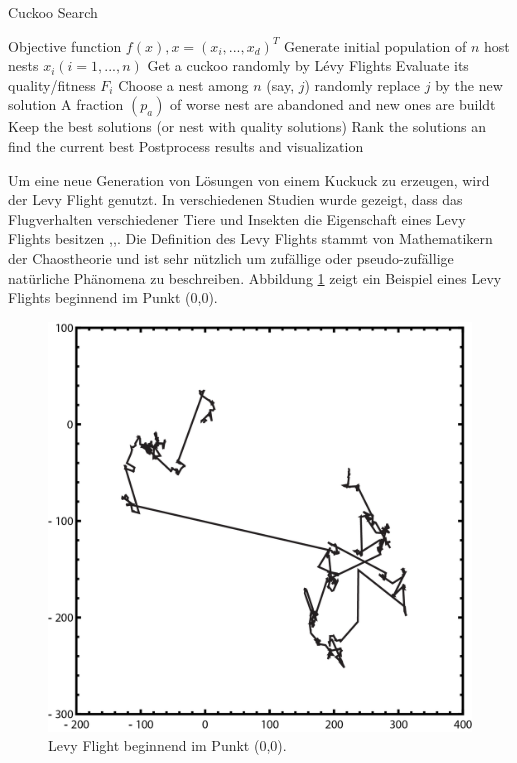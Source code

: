 \documentclass[conference]{IEEEtran}
\begin{document}
      \begin{algorithm}
      \caption{Cuckoo Search}\label{cuckooSearch}
        \begin{algorithmic}[1]
        \State Objective function $f(x), x = (x_{i}, ...,x_{d})^T$
        \State Generate initial population of $n$ host nests $x_{i} (i =1,...,n)$
          \State Get a cuckoo randomly by Lévy Flights
          \State Evaluate its quality/fitness $F_{i}$
          \State Choose a nest among $n$ (say, $j$) randomly
            \State replace $j$ by the new solution
          \EndIf
          \State A fraction $(p_{a})$ of worse nest are abandoned 
          \State and new ones are buildt 
          \State Keep the best solutions (or nest with quality solutions)
          \State Rank the solutions an find the current best
        \EndWhile
        \State Postprocess results and visualization
        \end{algorithmic}
      \end{algorithm}

      Um eine neue Generation von Lösungen von einem Kuckuck zu erzeugen, wird der Levy Flight genutzt. 
      In verschiedenen Studien wurde gezeigt, dass das Flugverhalten verschiedener Tiere und Insekten die 
      Eigenschaft eines Levy Flights besitzen \cite{b4},\cite{b5},\cite{b6}. Die Definition des Levy Flights 
      stammt von Mathematikern der Chaostheorie und ist sehr nützlich um zufällige oder pseudo-zufällige natürliche 
      Phänomena zu beschreiben. Abbildung \ref{fig:levyFlight} zeigt ein Beispiel eines Levy Flights beginnend im Punkt (0,0).

      \begin{figure}
        \centering
        \includegraphics[width=0.8\linewidth]{LevyFlight.png}
        \caption{Levy Flight beginnend im Punkt (0,0).}
        \label{fig:levyFlight}
      \end{figure}
\end{document}
